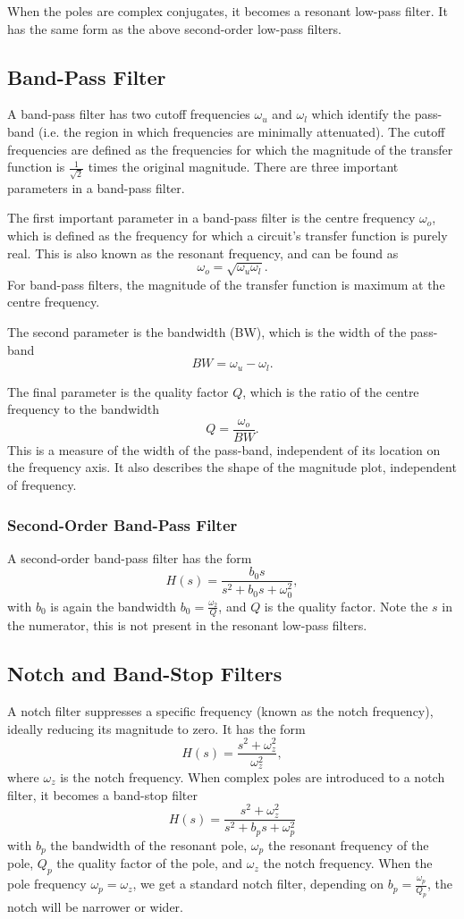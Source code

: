 \documentclass{article}
\begin{document}
When the poles are complex conjugates, it becomes a resonant low-pass filter. It has the same form as the above second-order low-pass filters.

\subsection{Band-Pass Filter}
A band-pass filter has two cutoff frequencies $\omega _u$ and $\omega _l$ which identify the pass-band (i.e. the region in which frequencies are minimally attenuated). The cutoff frequencies are defined as the frequencies for which the magnitude of the transfer function is $\frac{1}{\sqrt{2}}$ times the original magnitude. There are three important parameters in a band-pass filter.

The first important parameter in a band-pass filter is the centre frequency $\omega _o$, which is defined as the frequency for which a circuit's transfer function is purely real. This is also known as the resonant frequency, and can be found as
\[
    \omega _o=\sqrt{\omega _u\omega _l}.
\]
For band-pass filters, the magnitude of the transfer function is maximum at the centre frequency. 

The second parameter is the bandwidth (BW), which is the width of the pass-band
\[
    BW=\omega _u-\omega _l.
\]

The final parameter is the quality factor $Q$, which is the ratio of the centre frequency to the bandwidth
\[
    Q=\frac{\omega _o}{BW}.
\]
This is a measure of the width of the pass-band, independent of its location on the frequency axis. It also describes the shape of the magnitude plot, independent of frequency.

\subsubsection{Second-Order Band-Pass Filter}
A second-order band-pass filter has the form
\[
    H(s)=\frac{b_0s}{s^2+b_0s+\omega _0^2},
\]
with $b_0$ is again the bandwidth $b_0=\frac{\omega _2}{Q}$, and $Q$ is the quality factor. Note the $s$ in the numerator, this is not present in the resonant low-pass filters.

\subsection{Notch and Band-Stop Filters}
A notch filter suppresses a specific frequency (known as the notch frequency), ideally reducing its magnitude to zero. It has the form
\[
    H(s)=\frac{s^2+\omega _z^2}{\omega _z^2},
\]
where $\omega _z$ is the notch frequency. When complex poles are introduced to a notch filter, it becomes a band-stop filter
\[
    H(s)=\frac{s^2+\omega _z^2}{s^2+b_ps+\omega _p^2}
\]
with $b_p$ the bandwidth of the resonant pole, $\omega _p$ the resonant frequency of the pole, $Q_p$ the quality factor of the pole, and $\omega _z$ the notch frequency. When the pole frequency $\omega _p=\omega _z$, we get a standard notch filter, depending on $b_p=\frac{\omega _p}{Q_p}$, the notch will be narrower or wider.
\end{document}
